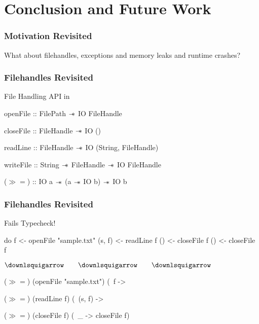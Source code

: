 \section{Conclusion and Future Work}\label{sec:conclusion}

\begin{frame}[fragile, c]
  \frametitle{Motivation Revisited}
  \begin{center}
    {\LARGE
      What about filehandles, exceptions and memory leaks and runtime crashes?
    }
\end{center}

\end{frame}

\begin{frame}[fragile, c]
  \frametitle{Filehandles Revisited}
  \begin{center}
  File Handling API in \qub{}
  \begin{haskell}
     openFile  :: FilePath   $\mathrel{-\mkern-6mu*}$ IO FileHandle

     closeFile :: FileHandle $\mathrel{-\mkern-6mu*}$ IO ()

     readLine  :: FileHandle $\mathrel{-\mkern-6mu*}$ IO (String, FileHandle)

     writeFile :: String     $\mathrel{-\mkern-6mu*}$ FileHandle
                             $\mathrel{-\mkern-6mu*}$ IO FileHandle




     ($\gg\!=$) :: IO a $\mathrel{-\mkern-6mu*}$ (a $\mathrel{-\mkern-6mu*}$ IO b) $\mathrel{-\mkern-6mu*}$ IO b
   \end{haskell}
\end{center}
\end{frame}

\begin{frame}[fragile, c]
  \frametitle{Filehandles Revisited}
  \begin{center}
  {\LARGE \color{white}Fails Typecheck!}

  \begin{haskell}
               do f  <- openFile "sample.txt"
                  (s, f)  <- readLine f
                  () <- closeFile f
                  () <- closeFile f
            \end{haskell}
{\LARGE      $\downlsquigarrow \qquad \downlsquigarrow \qquad \downlsquigarrow$}
            \begin{haskell}
               ($\gg\!=$) (openFile "sample.txt") (\ f ->

               ($\gg\!=$) (readLine f) (\ (s, f) ->

               ($\gg\!=$) (closeFile f) (\ _ -> closeFile f)
            \end{haskell}
          \end{center}

\end{frame}

